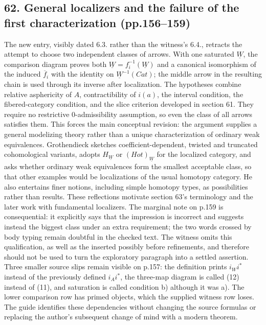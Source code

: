 \subsection*{62. General localizers and the failure of the first characterization (pp.156--159)}
The new entry, visibly dated 6.3. rather than the witness's 6.4., retracts the attempt to choose two independent classes of arrows. With one saturated $\underline W$, the comparison diagram proves both $\underline W=f_i^{-1}(\underline W)$ and a canonical isomorphism of the induced $\overline f_i$ with the identity on $\underline W^{-1}(Cat)$; the middle arrow in the resulting chain is used through its inverse after localization. The hypotheses combine relative asphericity of $A$, contractibility of $i(a)$, the interval condition, the fibered-category condition, and the slice criterion developed in section 61. They require no restrictive 0-admissibility assumption, so even the class of all arrows satisfies them. This forces the main conceptual revision: the argument supplies a general modelizing theory rather than a unique characterization of ordinary weak equivalences. Grothendieck sketches coefficient-dependent, twisted and truncated cohomological variants, adopts $H_{\underline W}$ or $(Hot)_{\underline W}$ for the localized category, and asks whether ordinary weak equivalences form the smallest acceptable class, so that other examples would be localizations of the usual homotopy category. He also entertains finer notions, including simple homotopy types, as possibilities rather than results. These reflections motivate section 63's terminology and the later work with fundamental localizers. The marginal note on p.159 is consequential: it explicitly says that the impression is incorrect and suggests instead the biggest class under an extra requirement; the two words crossed by body typing remain doubtful in the checked text. The witness omits this qualification, as well as the inserted possibly before refinements, and therefore should not be used to turn the exploratory paragraph into a settled assertion. Three smaller source slips remain visible on p.157: the definition prints $i_Wi^*$ instead of the previously defined $i_Ai^*$, the three-map diagram is called (12) instead of (11), and saturation is called condition b) although it was a). The lower comparison row has primed objects, which the supplied witness row loses. The guide identifies these dependencies without changing the source formulas or replacing the author's subsequent change of mind with a modern theorem.


